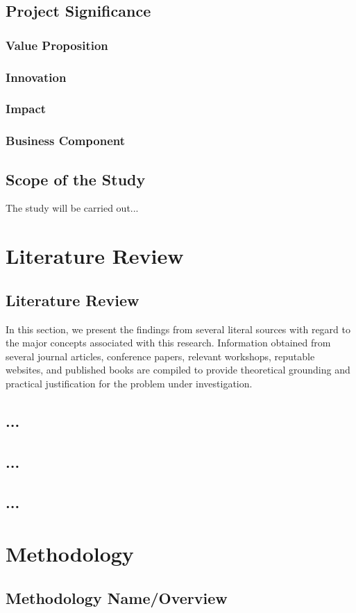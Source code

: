 \section{Project Significance} \label{researchsignificance}
\subsection{Value Proposition}

\subsection{Innovation}

\subsection{Impact}

\subsection{Business Component}

\section{Scope of the Study}
\noindent The study will be carried out...

\chapter{Literature Review}\label{chapter:Literature_Review}
\section{Literature Review}
In this section, we present the findings from several literal sources with regard to the major concepts associated with this research. Information obtained from several journal articles, conference papers, relevant workshops, reputable websites, and published books are compiled to provide theoretical grounding and practical justification for the problem under investigation.

\section{...}


\section{...}

\section{...}

\chapter{Methodology}\label{chapter:Methodology}
\section{Methodology Name/Overview}

